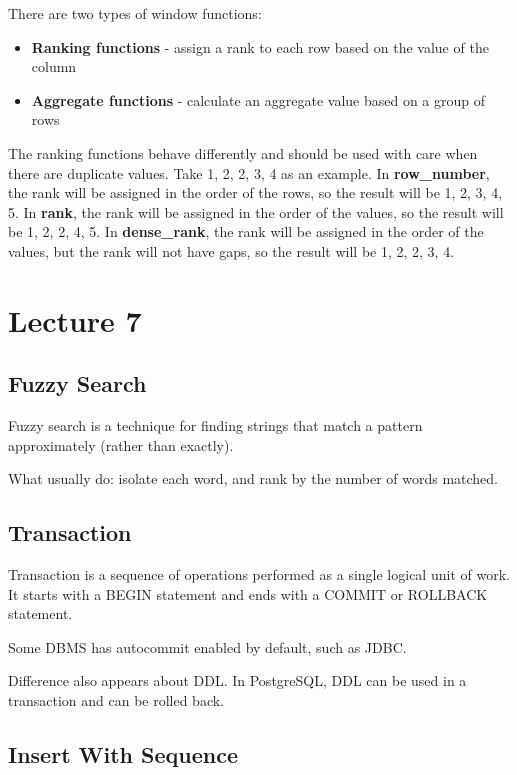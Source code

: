 \documentclass[a4paper,12pt]{article}
\begin{document}
There are two types of window functions:
\begin{itemize}
	\item \textbf{Ranking functions} - assign a rank to each row based on the value of the column
	\item \textbf{Aggregate functions} - calculate an aggregate value based on a group of rows
\end{itemize}

The ranking functions behave differently and should be used with care when there are duplicate values.
Take 1, 2, 2, 3, 4 as an example.
In \textbf{row\_number}, the rank will be assigned in the order of the rows, so the result will be 1, 2, 3, 4, 5.
In \textbf{rank}, the rank will be assigned in the order of the values, so the result will be 1, 2, 2, 4, 5.
In \textbf{dense\_rank}, the rank will be assigned in the order of the values, but the rank will not have gaps, so the result will be 1, 2, 2, 3, 4.

\section{Lecture 7}

\subsection{Fuzzy Search}

Fuzzy search is a technique for finding strings that match a pattern approximately (rather than exactly).

What usually do: isolate each word, and rank by the number of words matched.

\subsection{Transaction}

Transaction is a sequence of operations performed as a single logical unit of work.
It starts with a BEGIN statement and ends with a COMMIT or ROLLBACK statement.

Some DBMS has autocommit enabled by default, such as JDBC.

Difference also appears about DDL.
In PostgreSQL, DDL can be used in a transaction and can be rolled back.

\subsection{Insert With Sequence}
\end{document}

